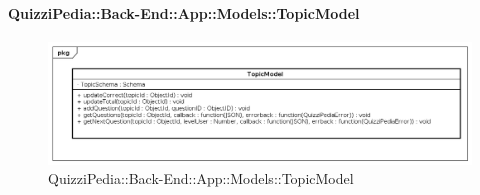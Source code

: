 \paragraph{QuizziPedia::Back-End::App::Models::TopicModel}
\label{QuizziPedia::Back-End::App::Models::TopicModel}
\begin{figure}
	\centering
	\includegraphics[scale=0.45]{UML/Classi/Back-End/QuizziPedia_Back-End_App_Models_topicModel.png}
	\caption{QuizziPedia::Back-End::App::Models::TopicModel}
\end{figure}
